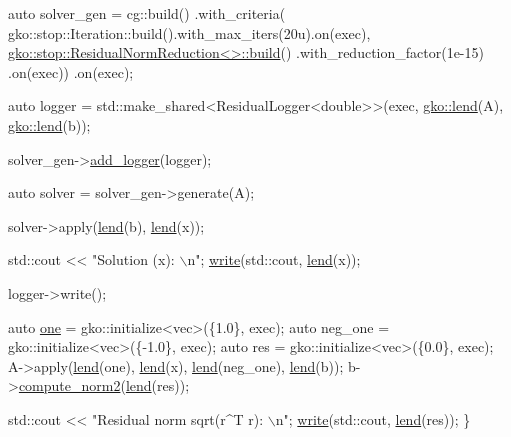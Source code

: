 \begin{DoxyCodeInclude}
    \textcolor{keyword}{auto} solver\_gen =
        cg::build()
            .with\_criteria(
                gko::stop::Iteration::build().with\_max\_iters(20u).on(exec),
                \hyperlink{classgko_1_1stop_1_1ResidualNormReduction}{gko::stop::ResidualNormReduction<>::build}()
                    .with\_reduction\_factor(1e-15)
                    .on(exec))
            .on(exec);

    \textcolor{keyword}{auto} logger = std::make\_shared<ResidualLogger<double>>(exec, \hyperlink{namespacegko_aa8cb4876b72e5e1036ea9575443c439b}{gko::lend}(A),
                                                           \hyperlink{namespacegko_aa8cb4876b72e5e1036ea9575443c439b}{gko::lend}(b));

    solver\_gen->\hyperlink{classgko_1_1log_1_1EnableLogging_a7b3493c14a37b4d46487d9c636d784f2}{add\_logger}(logger);

    \textcolor{keyword}{auto} solver = solver\_gen->generate(A);


    solver->apply(\hyperlink{namespacegko_aa8cb4876b72e5e1036ea9575443c439b}{lend}(b), \hyperlink{namespacegko_aa8cb4876b72e5e1036ea9575443c439b}{lend}(x));

    std::cout << \textcolor{stringliteral}{"Solution (x): \(\backslash\)n"};
    \hyperlink{namespacegko_a859dc47a462721d83728d91ab7fa2148}{write}(std::cout, \hyperlink{namespacegko_aa8cb4876b72e5e1036ea9575443c439b}{lend}(x));

    logger->write();

    \textcolor{keyword}{auto} \hyperlink{namespacegko_a0059e27f8f4bc348ff65c1e60caf47c8}{one} = gko::initialize<vec>(\{1.0\}, exec);
    \textcolor{keyword}{auto} neg\_one = gko::initialize<vec>(\{-1.0\}, exec);
    \textcolor{keyword}{auto} res = gko::initialize<vec>(\{0.0\}, exec);
    A->apply(\hyperlink{namespacegko_aa8cb4876b72e5e1036ea9575443c439b}{lend}(one), \hyperlink{namespacegko_aa8cb4876b72e5e1036ea9575443c439b}{lend}(x), \hyperlink{namespacegko_aa8cb4876b72e5e1036ea9575443c439b}{lend}(neg\_one), \hyperlink{namespacegko_aa8cb4876b72e5e1036ea9575443c439b}{lend}(b));
    b->\hyperlink{classgko_1_1matrix_1_1Dense_a97fd354c4a26814586cd256b5f0d7bea}{compute\_norm2}(\hyperlink{namespacegko_aa8cb4876b72e5e1036ea9575443c439b}{lend}(res));

    std::cout << \textcolor{stringliteral}{"Residual norm sqrt(r^T r): \(\backslash\)n"};
    \hyperlink{namespacegko_a859dc47a462721d83728d91ab7fa2148}{write}(std::cout, \hyperlink{namespacegko_aa8cb4876b72e5e1036ea9575443c439b}{lend}(res));
\}
\end{DoxyCodeInclude}
 